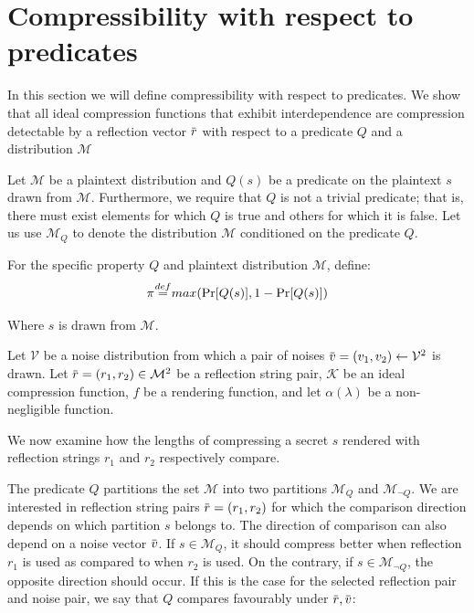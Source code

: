 \documentclass[conference, letterpaper, 10pt]{IEEEtran}
\newcommand\defeq{\stackrel{\mathclap{\normalfont\mbox{def}}}{=}}
\newcommand{\overbar}[1]{\mkern 1.5mu\overline{\mkern-1.5mu#1\mkern-1.5mu}\mkern 1.5mu}
\begin{document}
\section{Compressibility with respect to predicates}\label{sec:propertycom}
In this section we will define compressibility with respect to predicates. We
show that all ideal compression functions that exhibit interdependence are
compression detectable by a reflection vector $\overbar{r}$ with respect to a
predicate $Q$ and a distribution $\mathcal{M}$

Let $\mathcal{M}$ be a plaintext distribution and $Q(s)$ be a predicate on the
plaintext $s$ drawn from $\mathcal{M}$. Furthermore, we require that $Q$ is not a
trivial predicate; that is, there must exist elements for which $Q$ is true and
others for which it is false.  Let us use $\mathcal{M}_Q$ to denote the
distribution $\mathcal{M}$ conditioned on the predicate $Q$.

For the specific property $Q$ and plaintext distribution $\mathcal{M}$, define:
\begin{equation*}
    \pi \defeq max(\Pr[Q(s)], 1 - \Pr[Q(s)])
\end{equation*}

Where $s$ is drawn from $\mathcal{M}$.

Let $\mathcal{V}$ be a noise distribution from which a pair of noises
$\overbar{v} = (v_1, v_2) \leftarrow \mathcal{V}^2$ is drawn.  Let $\overbar{r}
= (r_1, r_2) \in \mathcal{M}^2$ be a reflection string pair, $\mathcal{K}$ be an ideal
compression function, $f$ be a rendering function, and let $\alpha(\lambda)$ be
a non-negligible function.

We now examine how the lengths of compressing a secret $s$ rendered with
reflection strings $r_1$ and $r_2$ respectively compare.

The predicate $Q$ partitions the set $\mathcal{M}$ into two partitions
$\mathcal{M}_Q$ and $\mathcal{M}_{\lnot Q}$. We are interested in reflection
string pairs $\overbar{r} = (r_1, r_2)$ for which the comparison direction
depends on which partition $s$ belongs to.  The direction of comparison can
also depend on a noise vector $\overbar{v}$.  If $s \in \mathcal{M}_Q$, it
should compress better when reflection $r_1$ is used as compared to when $r_2$
is used. On the contrary, if $s \in \mathcal{M}_{\lnot Q}$, the opposite
direction should occur.  If this is the case for the selected reflection pair
and noise pair, we say that $Q$ compares favourably under $\overbar{r},
\overbar{v}$:
\end{document}

